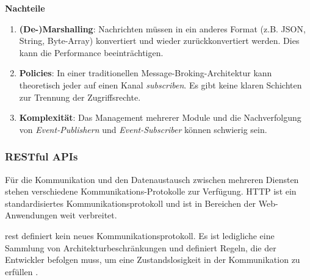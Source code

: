 \textbf{Nachteile}

\begin{enumerate}
    \item \textbf{(De-)Marshalling}: Nachrichten müssen in ein anderes Format (z.B. JSON, String, Byte-Array) konvertiert und wieder zurückkonvertiert werden. Dies kann die Performance beeinträchtigen.
    \item \textbf{Policies}: In einer traditionellen Message-Broking-Architektur kann theoretisch jeder auf einen Kanal \textit{subscriben}. Es gibt keine klaren Schichten zur Trennung der Zugriffsrechte.
    \item \textbf{Komplexität}: Das Management mehrerer Module und die Nachverfolgung von \textit{Event-Publishern} und \textit{Event-Subscriber} können schwierig sein.
\end{enumerate}

\subsubsection{RESTful APIs} \label{cha:grundlagen:collaboration:rest}

Für die Kommunikation und den Datenaustausch zwischen mehreren Diensten stehen verschiedene Kommunikations-Protokolle zur Verfügung. HTTP ist ein standardisiertes Kommunikationsprotokoll und ist in Bereichen der Web-Anwendungen weit verbreitet.

\ac{rest} definiert kein neues Kommunikationsprotokoll. Es ist ledigliche eine Sammlung von Architekturbeschränkungen und definiert Regeln, die der Entwickler befolgen muss, um eine Zustandslosigkeit in der Kommunikation zu erfüllen \autocite{RedHat2023}.

